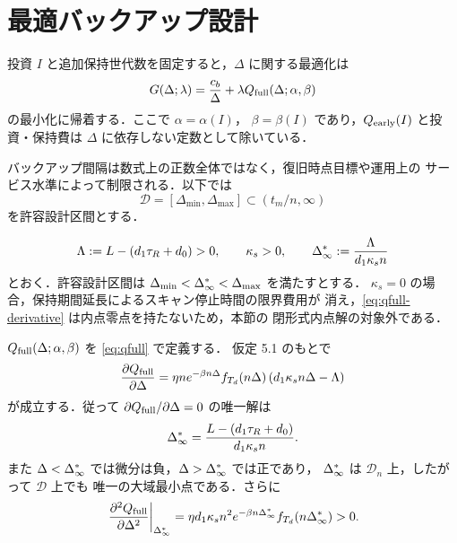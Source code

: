 \section{最適バックアップ設計}

投資 $I$ と追加保持世代数を固定すると，$\Delta$ に関する最適化は
\[
  G(\Delta;\lambda)=\frac{c_b}{\Delta}
  +\lambda Q_{\mathrm{full}}(\Delta;\alpha,\beta)
\]
の最小化に帰着する．ここで $\alpha=\alpha(I)$，
$\beta=\beta(I)$ であり，$Q_{\mathrm{early}}(I)$ と投資・保持費は
$\Delta$ に依存しない定数として除いている．

バックアップ間隔は数式上の正数全体ではなく，復旧時点目標や運用上の
サービス水準によって制限される．以下では
\[
  \mathcal{D}=[\Delta_{\min},\Delta_{\max}]
  \subset (t_m/n,\infty)
\]
を許容設計区間とする．

\begin{assumption}[内点設計条件]
\[
  \Lambda:=L-(d_1\tau_R+d_0)>0,\qquad
  \kappa_s>0,\qquad
  \Delta_\infty^\ast:=\frac{\Lambda}{d_1\kappa_s n}
\]
とおく．許容設計区間は
$\Delta_{\min}<\Delta_\infty^\ast<\Delta_{\max}$ を満たすとする．
$\kappa_s=0$ の場合，保持期間延長によるスキャン停止時間の限界費用が
消え，\eqref{eq:qfull-derivative} は内点零点を持たないため，本節の
閉形式内点解の対象外である．
\end{assumption}

\begin{theorem}
$Q_{\mathrm{full}}(\Delta;\alpha,\beta)$ を \eqref{eq:qfull} で定義する．
仮定 5.1 のもとで
\begin{equation}
  \frac{\partial Q_{\mathrm{full}}}{\partial\Delta}
  =\eta n e^{-\beta n\Delta}f_{T_d}(n\Delta)
  \left(d_1\kappa_s n\Delta-\Lambda\right)
  \label{eq:qfull-derivative}
\end{equation}
が成立する．従って $\partial Q_{\mathrm{full}}/\partial\Delta=0$ の唯一解は
\begin{equation}
  \Delta_\infty^\ast=\frac{L-(d_1\tau_R+d_0)}{d_1\kappa_s n}.
  \label{eq:dstar}
\end{equation}
また $\Delta<\Delta_\infty^\ast$ では微分は負，$\Delta>\Delta_\infty^\ast$ では正であり，
$\Delta_\infty^\ast$ は $\mathcal{D}_n$ 上，したがって $\mathcal{D}$ 上でも
唯一の大域最小点である．さらに
\[
  \left.\frac{\partial^2Q_{\mathrm{full}}}{\partial\Delta^2}\right|_{\Delta_\infty^\ast}
  =\eta d_1\kappa_s n^2 e^{-\beta n\Delta_\infty^\ast}f_{T_d}(n\Delta_\infty^\ast)>0 .
\]
\end{theorem}

